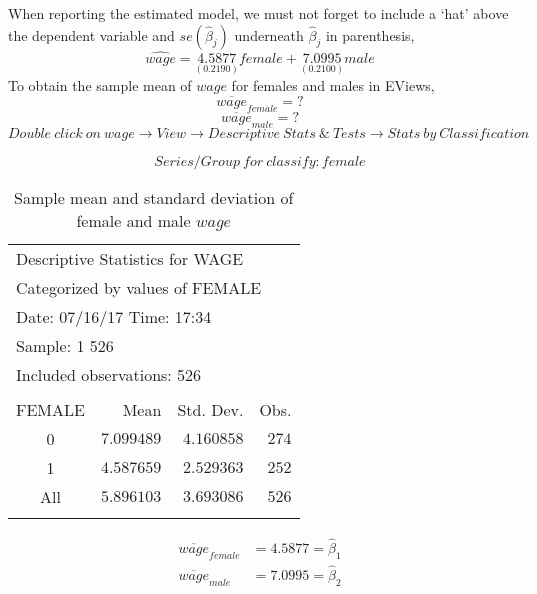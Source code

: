 \documentclass[12pt]{report}
\begin{document}
\vspace{-\baselineskip}
\noindent When reporting the estimated model, we must not forget to include a `hat' above the dependent variable and $se(\hat{\beta}_j)$ underneath $\hat{\beta}_j$ in parenthesis,
$$\widehat{wage} = \underset{(0.2190)}{4.5877}female + \underset{(0.2100)}{7.0995}male$$
\noindent To obtain the sample mean of $wage$ for females and males in EViews,
$$\overline{wage}_{female} = ?$$
$$\overline{wage}_{male} = ?$$
$$Double\ click\ on\ wage \to View \to Descriptive\ Stats\ \&\ Tests \to Stats\ by\ Classification$$
\begin{figure}[H]
	\centering
\end{figure}
\vspace{-\baselineskip}
$$Series/Group\ for\ classify: female$$
\begin{figure}[H]
	\centering
\end{figure}
\vspace{-\baselineskip}
\begin{table}[H]
	\centering
	\begin{tabular}{lrrr}
		\multicolumn{4}{l}{Descriptive Statistics for WAGE}\\
		\multicolumn{4}{l}{Categorized by values of FEMALE}\\
		\multicolumn{3}{l}{Date: 07/16/17   Time: 17:34}&\multicolumn{1}{c}{}\\
		\multicolumn{2}{l}{Sample: 1 526}&\multicolumn{1}{c}{}&\multicolumn{1}{c}{}\\
		\multicolumn{3}{l}{Included observations: 526}&\multicolumn{1}{c}{}\\
		[4.5pt] \hline \\ [-4.5pt]
		\multicolumn{1}{c|}{FEMALE}&\multicolumn{1}{r}{Mean}&\multicolumn{1}{r}{Std. Dev.}&\multicolumn{1}{r}{Obs.}\\
		\multicolumn{1}{c|}{0}&\multicolumn{1}{r}{$7.099489$}&\multicolumn{1}{r}{$4.160858$}&\multicolumn{1}{r}{$274$}\\
		\multicolumn{1}{c|}{1}&\multicolumn{1}{r}{$4.587659$}&\multicolumn{1}{r}{$2.529363$}&\multicolumn{1}{r}{$252$}\\
		\multicolumn{1}{c|}{All}&\multicolumn{1}{r}{$5.896103$}&\multicolumn{1}{r}{$3.693086$}&\multicolumn{1}{r}{$526$}\\
		[4.5pt] \hline \\ [-4.5pt]
	\end{tabular}
	\caption{Sample mean and standard deviation of female and male $wage$}
\end{table} \vspace{-\baselineskip} \begin{align*} 
	\overline{wage}_{female} &= 4.5877 = \hat{\beta}_1 \\
	\overline{wage}_{male} &= 7.0995 = \hat{\beta}_2
\end{align*} 
\end{document}

